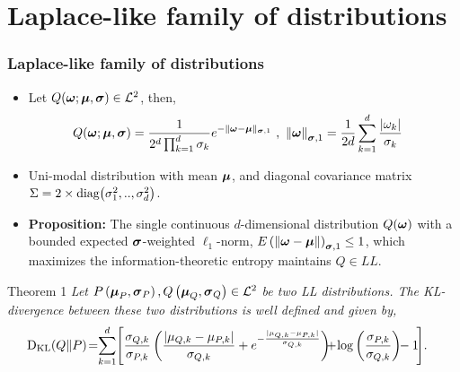 \documentclass[mathserif]{beamer}
\begin{document}
\section{ Laplace-like family of distributions}
\begin{frame}
\frametitle{ Laplace-like family of distributions }
\begin{itemize}
\item Let $Q({\boldsymbol{\omega}};{\boldsymbol{\mu}},{\boldsymbol{\sigma}})\in{\mathcal{L}}^2$, then,
\begin{align*}
Q({\boldsymbol{\omega}};{\boldsymbol{\mu}},{\boldsymbol{\sigma}})&= \frac{1}{2^d \prod_{k=1}^d \sigma_{k}}
e^{{-\| {\boldsymbol{\omega}}-{\boldsymbol{\mu}} \|_{{\boldsymbol{\sigma}},1}} } ~,~ {\| {\boldsymbol{\omega}} \|}_{{\boldsymbol{\sigma}},1} = \frac{1}{2d}\sum_{k=1}^{d}
\frac{ |\omega_{k}| }{\sigma_{k}}
\end{align*}

\item Uni-modal distribution with mean ${\boldsymbol{\mu}}$, and diagonal covariance matrix $\Sigma=2\times{\textrm{diag}}{\left({\sigma_1^2,..,\sigma_d^2}\right)}$.
\item \textbf{Proposition:}  The single continuous $d$-dimensional distribution $Q({\boldsymbol{\omega}})$ with a bounded expected ${\boldsymbol{\sigma}}$-weighted $\ell_1$-norm, $E \left({\| {\boldsymbol{\omega}}-{\boldsymbol{\mu}} \|}\right)_{{\boldsymbol{\sigma}},1} \leq 1$,  which
maximizes the information-theoretic entropy maintains $Q\in LL$.
\end{itemize}
\vspace{-0.1cm}
\begin{block}{Theorem 1}
\textit{Let ${P}\left({{\boldsymbol{\mu}}_P,{\boldsymbol{\sigma}}_{P}}\right),{Q}\left({{\boldsymbol{\mu}}_Q,{\boldsymbol{\sigma}}_{Q}}\right)\in{\mathcal{L}}^2$
be two LL distributions. The KL- divergence between these two distributions is well defined and given by,}
\begin{align*}
\KL(\cQ \Vert \cP)  \!=&\! \sum_{k=1}^{d}\!  \Bigg[    \frac{\sigmaqi{k}}{\sigmapi{k} }\paren{ \frac{ |\muqi{k}-\mupi{k}| }{\sigmaqi{k}}+e^{{-\frac{ |\muqi{k}-\mupi{k}| }{\sigmaqi{k}} } }  }
\!\!\!+\!\log{ \paren{ \frac{\sigmapi{k}}{\sigmaqi{k}} } }\!\!-1\! \Bigg].
\end{align*}
\end{block}
\end{frame}
\end{document}
